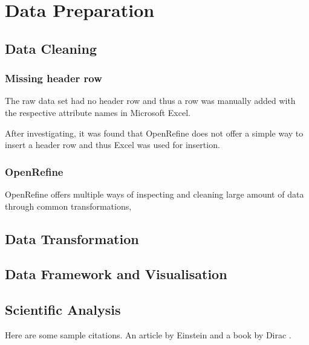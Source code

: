 \graphicspath{{Images/}}

\section{Data Preparation}
    \subsection{Data Cleaning}
        \subsubsection{Missing header row}
            The raw data set had no header row and thus a row was manually added with the respective attribute names in Microsoft Excel.
            
            After investigating, it was found that OpenRefine does not offer a simple way to insert a header row and thus Excel was used for insertion.
        \subsubsection{OpenRefine}
            OpenRefine offers multiple ways of inspecting and cleaning large amount of data through common transformations,  
    
    \subsection{Data Transformation}
    \subsection{Data Framework and Visualisation}
    \subsection{Scientific Analysis}
Here are some sample citations. An article by Einstein \cite{einstein} and a book by Dirac \cite{dirac}.
